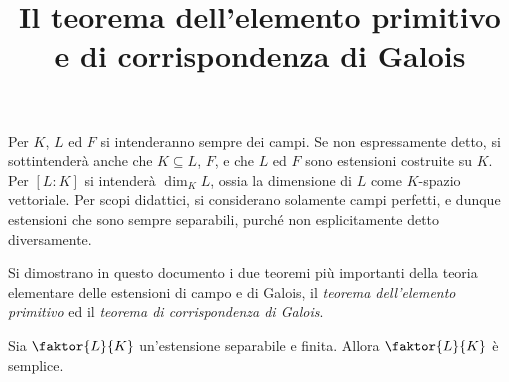 \documentclass[12pt]{scrartcl}
\begin{document}
	\title{Il teorema dell'elemento primitivo e di corrispondenza di Galois}
	\maketitle
	
	\begin{note}
		Per $K$, $L$ ed $F$ si intenderanno sempre dei campi.
		Se non espressamente detto, si sottintenderà anche
		che $K \subseteq L$, $F$, e che $L$ ed $F$ sono
		estensioni costruite su $K$. Per $[L : K]$ si
		intenderà $\dim_K L$, ossia la dimensione di $L$
		come $K$-spazio vettoriale. Per scopi didattici, si
		considerano solamente campi perfetti, e dunque estensioni che sono sempre separabili, purché
		non esplicitamente detto diversamente.
	\end{note} \bigskip

	Si dimostrano in questo documento i due teoremi più
	importanti della teoria elementare delle estensioni di campo
	e di Galois, il \textit{teorema dell'elemento primitivo} ed
	il \textit{teorema di corrispondenza di Galois}.
	
	\begin{theorem}
		Sia $\faktor{L}{K}$ un'estensione separabile e
		finita. Allora $\faktor{L}{K}$ è semplice.
	\end{theorem}
	
\end{document}
